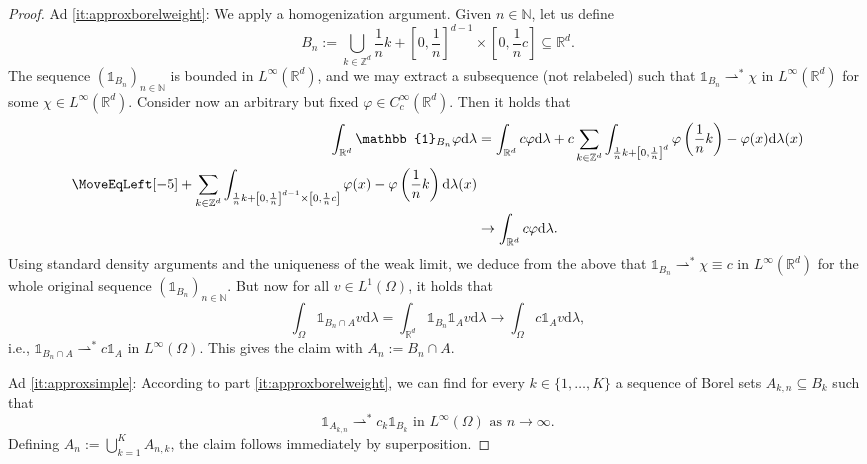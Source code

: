 \documentclass[reqno]{shinyart}
\begin{document}
\begin{proof}
    Ad \ref{it:approxborelweight}: We apply a homogenization argument.
    Given $n \in \mathbb{N}$, let us define 
    \begin{equation*}
        B_{n} := \bigcup_{k \in \mathbb{Z}^d} \frac{1}{n} k 
        + \left [0, \frac{1}{n} \right ]^{d-1} \times \left [0, \frac{1}{n} c \right ] 
        \subseteq {\mathbb{R}}^d.
    \end{equation*}
    The sequence $(\mathbb{1}_{B_n})_{n \in \mathbb{N}}$ is bounded in $L^\infty({\mathbb{R}}^d)$, 
    and we may extract a subsequence (not relabeled) such that 
    $\mathbb{1}_{B_n} {\rightharpoonup}^{*}  \chi$ in $L^\infty({\mathbb{R}}^d)$ 
    for some $\chi \in L^\infty({\mathbb{R}}^d)$. 
    Consider now an arbitrary but fixed $\varphi \in C_c^\infty({\mathbb{R}}^d)$. Then it holds that
    \begin{equation*}
        \begin{aligned}
            \int_{{\mathbb{R}}^d} \mathbb{1}_{B_n} \varphi \mathrm{d}\lambda 
            & = \int_{{\mathbb{R}}^d} c  \varphi   \mathrm{d}\lambda  + c\sum_{k \in \mathbb{Z}^d}  
            \int_{\frac{1}{n} k + \left [0, \frac{1}{n} \right ]^{d} } \varphi\left (\frac{1}{n} k \right ) 
            - \varphi(x)  \mathrm{d}\lambda(x)\\
            \MoveEqLeft[-5]  +  \sum_{k \in \mathbb{Z}^d} \int_{\frac{1}{n} k 
            + \left [0, \frac{1}{n} \right ]^{d-1} \times \left [0, \frac{1}{n} c \right ]} 
            \varphi(x) -  \varphi\left (\frac{1}{n} k \right ) \mathrm{d}\lambda(x) \\
            &\to \int_{{\mathbb{R}}^d} c  \varphi \mathrm{d}\lambda.
        \end{aligned}
    \end{equation*}
    Using standard density arguments and the uniqueness of the weak limit, 
    we deduce from the above that 
    $\mathbb{1}_{B_n} {\rightharpoonup}^{*}  \chi \equiv c$ in $L^\infty({\mathbb{R}}^d)$ 
    for the whole original sequence $(\mathbb{1}_{B_n})_{n \in \mathbb{N}}$. 
    But now for all $v \in L^1(\Omega)$, it holds that
    \begin{equation*}
        \int_\Omega \mathbb{1}_{B_n \cap A}  v  \mathrm{d}\lambda 
        = \int_{{\mathbb{R}}^d}\mathbb{1}_{B_n}  \mathbb{1}_{A} v  \mathrm{d}\lambda 
        \to \int_\Omega c \mathbb{1}_{A} v \mathrm{d}\lambda, 
    \end{equation*}
    i.e., $\mathbb{1}_{B_n \cap A} {\rightharpoonup}^{*}   c\mathbb{1}_{A} $ 
    in $L^\infty(\Omega)$. This gives the claim with $A_n := B_n \cap A$.

    Ad \ref{it:approxsimple}:
    According to part \ref{it:approxborelweight}, we can find
    for every $k \in \{1,\dots,K\}$ a sequence of Borel sets $A_{k,n}\subseteq B_k$ such that
    \begin{equation*}
        \mathbb{1}_{A_{k, n}} {\rightharpoonup}^{*}  c_k\mathbb{1}_{B_k}
        \text{ in } L^\infty(\Omega) \text{ as }n \to \infty. 
    \end{equation*}
    Defining $A_n := \bigcup_{k=1}^K A_{n, k}$, the claim follows immediately by superposition. 
\end{proof}
\end{document}
